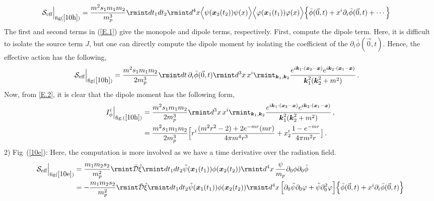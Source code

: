 \begin{align}
    \begin{split}
\mathcal{S}_{\text{eff}}\Big |_{\text{fig}(\ref{10h})}&=\frac{m^2 s_1m_1m_2}{m_p^3}\rmint dt_1dt_2\rmint d^4x \Big\langle \psi(\boldsymbol{x}_2(t_2))\psi(x)\Big\rangle \Big\langle\varphi(\boldsymbol{x}_1(t_1))\varphi(x) \Big\rangle \Big\{\bar{\phi}(\vec 0,t)+x^i\partial_{i}\bar\phi(\vec 0,t)+\cdots\Big\}\,\label{E.1}
    \end{split}
\end{align}
The first and second terms in (\ref{E.1}) give the monopole and dipole terms, respectively. First, compute the dipole term. Here, it is difficult to isolate the source term $J$, but one can directly compute the dipole moment by isolating the coefficient of the $\partial_i \bar \phi(\vec 0,t)$. Hence, the effective action has the following, 
\begin{align}
    \begin{split}
        \mathcal{S}_{\text{eff}}\Big |_{\text{fig}(\ref{10h})}&=\frac{m^2 s_1m_1m_2}{2 m_p^3}\rmint dt\,\partial_i\bar\phi(\vec 0,t)\rmint d^3x\,x^i \rmint_{\boldsymbol{k}_1,\boldsymbol{k}_2}\frac{e^{i\boldsymbol{k}_1\cdot (\boldsymbol{x}_2-\boldsymbol{x})}e^{i\boldsymbol{k}_2\cdot (\boldsymbol{x}_1-\boldsymbol{x})}}{\boldsymbol{k}_1^2(\boldsymbol{k}_2^2+m^2)}\,.\label{E.2}
    \end{split}
\end{align}
Now, from \eqref{E.2}, it is clear that the dipole moment has the following form,
\begin{align}
    \begin{split}
        I_{\phi}^{i}\Big|_{\text{fig.} (\ref{10h})}&=\frac{m^2 s_1m_1m_2}{2 m_p^3}\rmint d^3x\,x^i \rmint_{\boldsymbol{k}_1,\boldsymbol{k}_2}\frac{e^{i\boldsymbol{k}_1\cdot (\boldsymbol{x}_2-\boldsymbol{x})}e^{i\boldsymbol{k}_2\cdot (\boldsymbol{x}_1-\boldsymbol{x})}}{\boldsymbol{k}_1^2(\boldsymbol{k}_2^2+m^2)}\,,\\ &
        =\frac{m^2 s_1m_1m_2}{2 m_p^3}\Big[r^i\frac{(m^2r^2-2)+2e^{-mr}(mr)}{4\pi m^4 r^3}+x_2^i\frac{1-e^{-mr}}{4\pi m^2 r}\big]\,.
    \end{split}
\end{align}
2) Fig~(\ref{10e}): Here, the computation is more involved as we have a time derivative over the radiation field.
\begin{align}
    \begin{split}
        \mathcal{S}_{\text{eff}}\Big |_{\text{fig}(\ref{10e})}&=\frac{m_1m_2s_2}{m_p^2}\rmint\Bar{\mathcal{D}}\Hat{\xi}\rmint dt_1dt_2\tilde{\psi}(\boldsymbol{x}_1(t_1))\phi(\boldsymbol{x}_2(t_2))\rmint d^4x \,\frac{\psi}{m_p}\partial_0\phi\partial_0\bar{\phi}\\ &
        =-\frac{m_1m_2s_2}{m_p^2}\rmint \Bar{\mathcal{D}}\Hat{\xi}\rmint dt_1dt_2\tilde{\psi}(\boldsymbol{x}_1(t_1))\phi(\boldsymbol{x}_2(t_2))\rmint d^4x \,\Big[\partial_0\tilde\psi\partial_0 \varphi+\tilde\psi\partial_0^2 \varphi\Big]\Big\{\bar\phi(\vec 0,t)+x^i \partial_i \bar\phi(\vec 0,t)\Big\}
    \end{split}
\end{align}
